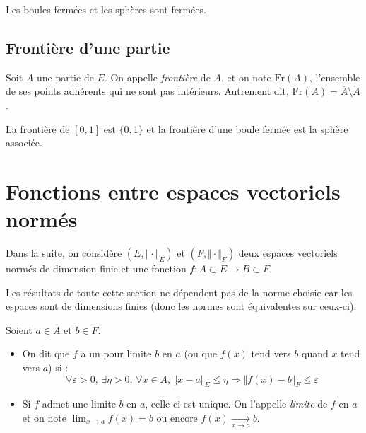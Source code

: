 \documentclass[french,11pt,twoside]{VcCours}
\begin{document}
%
%

\begin{Corollaire}{} Les boules fermées et les sphères sont fermées.
\end{Corollaire}

\begin{Demonstration}{}

\newpage

\vspace*{8cm}

\end{Demonstration}



\subsection{Frontière d'une partie}

\begin{Definition}{} Soit $A$ une partie de $E$. On appelle \emph{frontière} de $A$, et on note $\textrm{Fr}(A)$, l'ensemble de ses points adhérents qui ne sont pas intérieurs. Autrement dit, $\textrm{Fr}(A) = \overline{A} \setminus \mathring{A}$.
\end{Definition} 

\begin{Exemple} La frontière de $[0,1]$ est $\lbrace 0,1 \rbrace$ et la frontière d'une boule fermée est la sphère associée.
\end{Exemple}

\section{Fonctions entre espaces vectoriels normés}

Dans la suite, on considère $(E, \Vert \cdot \Vert_E)$ et $(F, \Vert \cdot \Vert_F)$ deux espaces vectoriels normés de dimension finie et une fonction $f : A \subset E \rightarrow B \subset F$.

\begin{Theoreme}{} Les résultats de toute cette section ne dépendent pas de la norme choisie car les espaces sont de dimensions finies (donc les normes sont équivalentes sur ceux-ci).
\end{Theoreme}


\begin{TheoremeDefinition}{} Soient $a \in \overline{A}$ et $b \in F$.

\begin{itemize}
\item On dit que $f$ a un pour limite $b$ en $a$ (ou que $f(x)$ tend vers $b$ quand $x$ tend vers $a$) si :
$$ \forall \varepsilon >0, \, \exists \eta > 0, \, \forall x \in A, \, \Vert x- a \Vert_E \leq \eta \Rightarrow \Vert f(x) - b \Vert_F \leq \varepsilon$$
\item Si $f$ admet une limite $b$ en $a$, celle-ci est unique. On l'appelle \emph{limite} de $f$ en $a$ et on note $\lim_{x \rightarrow a} f(x) = b$ ou encore $f(x) \underset{x \rightarrow a}{\rightarrow} b$.
\end{itemize}
\end{TheoremeDefinition}
\end{document}
